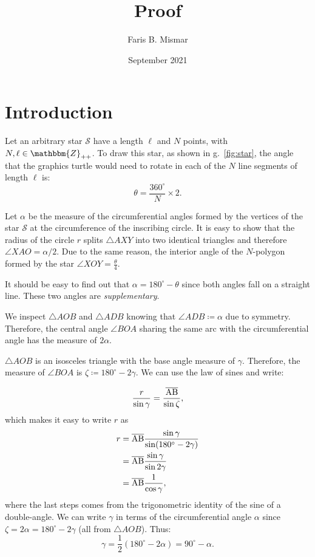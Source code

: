 \documentclass{article}
\title{Proof}
\author{Faris B. Mismar}
\date{September 2021}
\begin{document}
\maketitle

\section{Introduction}

Let an arbitrary star $\mathcal{S}$ have a length $\ell$ and $N$ points, with $N, \ell \in \mathbbm{Z}_{++}$.  To draw this star, as shown in g.~\ref{fig:star}, the angle that the graphics turtle would need to rotate in each of the $N$ line segments of length $\ell$ is:
\begin{equation}
    \theta = \frac{360^\circ}{N} \times 2.
\end{equation}%

Let $\alpha$ be the measure of the circumferential angles formed by the vertices of the star $\mathcal{S}$ at the circumference of the inscribing circle.  It is easy to show that the radius of the circle $r$ splits $\triangle AXY$ into two identical triangles and therefore $\angle XAO = \alpha/2$.  Due to the same reason, the interior angle of the $N$-polygon formed by the star $\angle XOY = \frac{\theta}{4}$.

It should be easy to find out that $\alpha = 180^\circ - \theta$ since both angles fall on a straight line.  These two angles are \textit{supplementary}.

We inspect $\triangle AOB$ and $\triangle ADB$ knowing that $\angle ADB \coloneqq \alpha$ due to symmetry.  Therefore, the central angle $\angle BOA$ sharing the same arc with the circumferential angle has the measure of $2\alpha$.

$\triangle AOB$ is an isosceles triangle with the base angle measure of $\gamma$.  Therefore, the measure of $\angle BOA$ is $\zeta \coloneqq 180^\circ - 2 \gamma$.  We can use the law of sines and write:

\begin{equation}
    \frac{r}{\sin \gamma}  = \frac{\overline{\rm AB}}{\sin \zeta},
\end{equation}
which makes it easy to write $r$ as
\begin{equation}
\begin{aligned}
r &= \overline{\rm AB} \frac{\sin \gamma}{\sin (180^\circ - 2\gamma)} \\
  &= \overline{\rm AB} \frac{\sin \gamma}{\sin 2\gamma} \\ 
  &= \overline{\rm AB} \frac{1}{\cos \gamma}, \\ 
\end{aligned}
\end{equation}%
where the last steps comes from the trigonometric identity of the sine of a double-angle.  We can write $\gamma$ in terms of the circumferential angle $\alpha$ since $\zeta = 2\alpha = 180^\circ - 2\gamma$ (all from $\triangle AOB$).  Thus:
\begin{equation}
    \gamma = \frac{1}{2} (180^\circ - 2\alpha) = 90^\circ - \alpha.
\end{equation}
\end{document}
